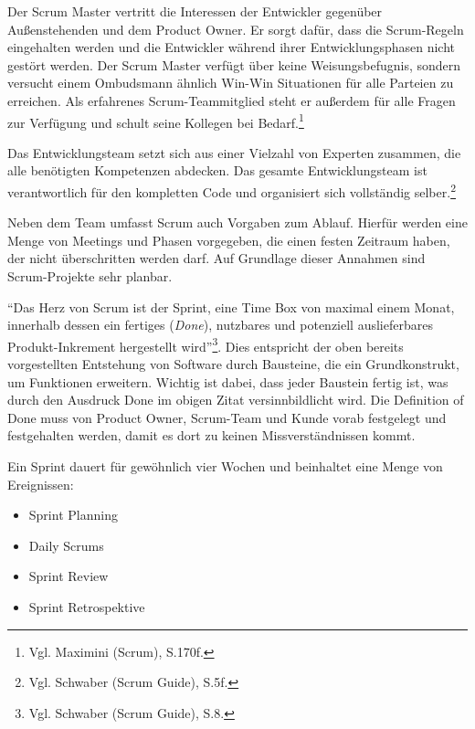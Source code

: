             Der Scrum Master vertritt die Interessen der Entwickler gegenüber Außenstehenden und dem Product Owner. Er sorgt dafür, dass die Scrum-Regeln eingehalten werden und die Entwickler während ihrer Entwicklungsphasen nicht gestört werden. Der Scrum Master verfügt über keine Weisungsbefugnis, sondern versucht einem Ombudsmann ähnlich Win-Win Situationen für alle Parteien zu erreichen. Als erfahrenes Scrum-Teammitglied steht er außerdem für alle Fragen zur Verfügung und schult seine Kollegen bei Bedarf.\footnote{Vgl. Maximini (Scrum), S.170f.}

            Das Entwicklungsteam setzt sich aus einer Vielzahl von Experten zusammen, die alle benötigten Kompetenzen abdecken. Das gesamte Entwicklungsteam ist verantwortlich für den kompletten Code und organisiert sich vollständig selber.\footnote{Vgl. Schwaber (Scrum Guide), S.5f.}

            Neben dem Team umfasst Scrum auch Vorgaben zum Ablauf. Hierfür werden eine Menge von Meetings und Phasen vorgegeben, die einen festen Zeitraum haben, der nicht überschritten werden darf. Auf Grundlage dieser Annahmen sind Scrum-Projekte sehr planbar.

            \enquote{Das Herz von Scrum ist der Sprint, eine Time Box von maximal einem Monat, innerhalb dessen ein fertiges (\emph{Done}), nutzbares und potenziell auslieferbares Produkt-Inkrement hergestellt wird}\footnote{Vgl. Schwaber (Scrum Guide), S.8.}. Dies entspricht der oben bereits vorgestellten Entstehung von Software durch Bausteine, die ein Grundkonstrukt, um Funktionen erweitern. Wichtig ist dabei, dass jeder Baustein fertig ist, was durch den Ausdruck Done im obigen Zitat versinnbildlicht wird. Die Definition of Done muss von Product Owner, Scrum-Team und Kunde vorab festgelegt und festgehalten werden, damit es dort zu keinen Missverständnissen kommt.

            Ein Sprint dauert für gewöhnlich vier Wochen und beinhaltet eine Menge von Ereignissen:
            \begin{itemize}
                \item Sprint Planning
                \item Daily Scrums
                \item Sprint Review
                \item Sprint Retrospektive
            \end{itemize}

